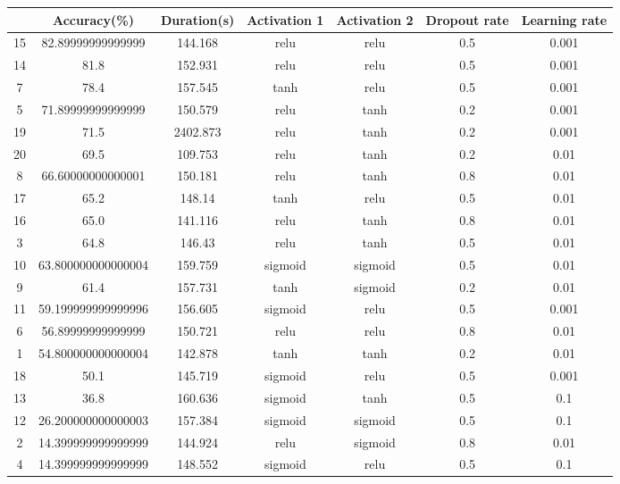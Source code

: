 \begin{table}[h]
\centering
\begin{tabular}{@{}ccccccc@{}}
\toprule
   & Accuracy(\%)       & Duration(s) & Activation 1 & Activation 2 & Dropout rate & Learning rate \\ \midrule
15 & 82.89999999999999  & 144.168     & relu         & relu         & 0.5          & 0.001         \\
14 & 81.8               & 152.931     & relu         & relu         & 0.5          & 0.001         \\
7  & 78.4               & 157.545     & tanh         & relu         & 0.5          & 0.001         \\
5  & 71.89999999999999  & 150.579     & relu         & tanh         & 0.2          & 0.001         \\
19 & 71.5               & 2402.873    & relu         & tanh         & 0.2          & 0.001         \\
20 & 69.5               & 109.753     & relu         & tanh         & 0.2          & 0.01          \\
8  & 66.60000000000001  & 150.181     & relu         & tanh         & 0.8          & 0.01          \\
17 & 65.2               & 148.14      & tanh         & relu         & 0.5          & 0.01          \\
16 & 65.0               & 141.116     & relu         & tanh         & 0.8          & 0.01          \\
3  & 64.8               & 146.43      & relu         & tanh         & 0.5          & 0.01          \\
10 & 63.800000000000004 & 159.759     & sigmoid      & sigmoid      & 0.5          & 0.01          \\
9  & 61.4               & 157.731     & tanh         & sigmoid      & 0.2          & 0.01          \\
11 & 59.199999999999996 & 156.605     & sigmoid      & relu         & 0.5          & 0.001         \\
6  & 56.89999999999999  & 150.721     & relu         & relu         & 0.8          & 0.01          \\
1  & 54.800000000000004 & 142.878     & tanh         & tanh         & 0.2          & 0.01          \\
18 & 50.1               & 145.719     & sigmoid      & relu         & 0.5          & 0.001         \\
13 & 36.8               & 160.636     & sigmoid      & tanh         & 0.5          & 0.1           \\
12 & 26.200000000000003 & 157.384     & sigmoid      & sigmoid      & 0.5          & 0.1           \\
2  & 14.399999999999999 & 144.924     & relu         & sigmoid      & 0.8          & 0.01          \\
4  & 14.399999999999999 & 148.552     & sigmoid      & relu         & 0.5          & 0.1           \\ \bottomrule
\end{tabular}
\end{table}

